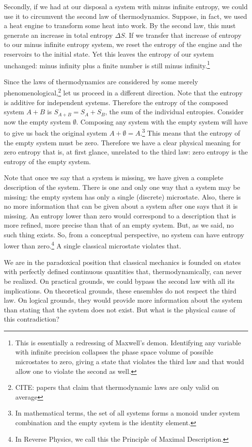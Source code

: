 \documentclass[10pt,twocolumn, nofootinbib]{revtex4-2}
\begin{document}
Secondly, if we had at our disposal a system with minus infinite entropy, we could use it to circumvent the second law of thermodynamics. Suppose, in fact, we used a heat engine to transform some heat into work. By the second law, this must generate an increase in total entropy $\Delta S$. If we transfer that increase of entropy to our minus infinite entropy system, we reset the entropy of the engine and the reservoirs to the initial state. Yet this leaves the entropy of our system unchanged: minus infinity plus a finite number is still minus infinity.\footnote{This is essentially a redressing of Maxwell's demon. Identifying any variable with infinite precision collapses the phase space volume of possible microstates to zero, giving a state that violates the third law and that would allow one to violate the second as well.}

Since the laws of thermodynamics are considered by some merely phenomenological,\footnote{CITE: papers that claim that thermodynamic laws are only valid on average} let us proceed in a different direction. Note that the entropy is additive for independent systems. Therefore the entropy of the composed system $A+B$ is $S_{A+B} = S_A + S_B$, the sum of the individual entropies. Consider now the empty system $\emptyset$. Composing any system with the empty system will have to give us back the original system $A+\emptyset = A$.\footnote{In mathematical terms, the set of all systems forms a monoid under system combination and the empty system is the identity element.} This means that the entropy of the empty system must be zero. Therefore we have a clear physical meaning for zero entropy that is, at first glance, unrelated to the third law: zero entropy is the entropy of the empty system.

Note that once we say that a system is missing, we have given a complete description of the system. There is one and only one way that a system may be missing: the empty system has only a single (discrete) microstate. Also, there is no more information that can be given about a system after one says that it is missing. An entropy lower than zero would correspond to a description that is more refined, more precise than that of an empty system. But, as we said, no such thing exists. So, from a conceptual perspective, no system can have entropy lower than zero.\footnote{In Reverse Physics, we call this the Principle of Maximal Description.} A single classical microstate violates that.

We are in the paradoxical position that classical mechanics is founded on states with perfectly defined continuous quantities that, thermodynamically, can never be realized. On practical grounds, we could bypass the second law with all its implications. On theoretical grounds, these ensembles do not respect the third law. On logical grounds, they would provide more information about the system than stating that the system does not exist. But what is the physical cause of this contradiction?
\end{document}
